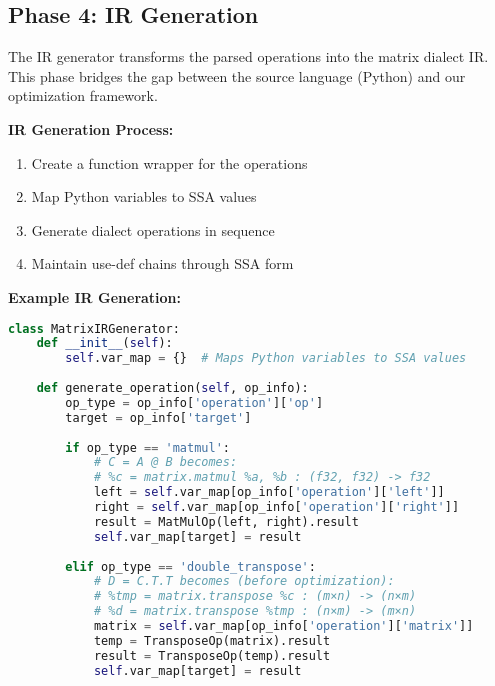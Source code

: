 \documentclass[11pt,a4paper]{article}
\begin{document}
\subsection{Phase 4: IR Generation}

The IR generator transforms the parsed operations into the matrix dialect IR. This phase bridges the gap between the source language (Python) and our optimization framework.

\textbf{IR Generation Process:}
\begin{enumerate}
    \item Create a function wrapper for the operations
    \item Map Python variables to SSA values
    \item Generate dialect operations in sequence
    \item Maintain use-def chains through SSA form
\end{enumerate}

\textbf{Example IR Generation:}
\begin{lstlisting}[language=Python, caption=Translating parsed operations to IR]
class MatrixIRGenerator:
    def __init__(self):
        self.var_map = {}  # Maps Python variables to SSA values
    
    def generate_operation(self, op_info):
        op_type = op_info['operation']['op']
        target = op_info['target']
        
        if op_type == 'matmul':
            # C = A @ B becomes:
            # %c = matrix.matmul %a, %b : (f32, f32) -> f32
            left = self.var_map[op_info['operation']['left']]
            right = self.var_map[op_info['operation']['right']]
            result = MatMulOp(left, right).result
            self.var_map[target] = result
        
        elif op_type == 'double_transpose':
            # D = C.T.T becomes (before optimization):
            # %tmp = matrix.transpose %c : (m×n) -> (n×m)
            # %d = matrix.transpose %tmp : (n×m) -> (m×n)
            matrix = self.var_map[op_info['operation']['matrix']]
            temp = TransposeOp(matrix).result
            result = TransposeOp(temp).result
            self.var_map[target] = result
\end{lstlisting}
\end{document}
